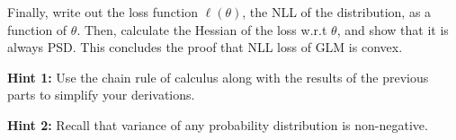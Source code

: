 \item {}
Finally, write out the loss function $\ell(\theta)$, the NLL of the
distribution, as a function of $\theta$. Then, calculate the Hessian of the
loss w.r.t $\theta$, and show that it is always PSD. This concludes the proof
that NLL loss of GLM is convex.

\textbf{Hint 1:} Use the chain rule of calculus along with the results of
the previous parts to simplify your derivations.

\textbf{Hint 2:} Recall that variance of any probability distribution is
non-negative.
